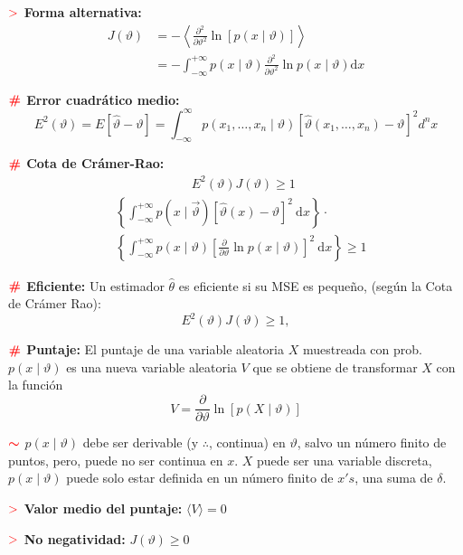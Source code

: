\documentclass[%
 reprint,
 amsmath,amssymb,
 aps,
]{revtex4-1}
\begin{document}
\textbf{$\textcolor{red}{\mathbf{>}}$ Forma alternativa:} 
$$
\begin{aligned}
J(\vartheta) &=-\left\langle\frac{\partial^{2}}{\partial \vartheta^{2}} \ln [p(x \mid \vartheta)]\right\rangle \\
&=-\int_{-\infty}^{+\infty} p(x \mid \vartheta) \frac{\partial^{2}}{\partial \vartheta^{2}} \ln p(x \mid \vartheta) \mathrm{d} x
\end{aligned}
$$

\textbf{$\color{red}{\textbf{\#}}$ Error cuadrático medio:}
$$
E^{2}(\vartheta) = E[ \hat{\vartheta} - \vartheta ] = \int_{-\infty}^\infty p\left(x_{1}, \ldots, x_{n} \mid \vartheta\right)\left[\hat{\vartheta}\left(x_{1}, \ldots, x_{n}\right)-\vartheta\right]^{2} {d}^{n} x 
$$

\textbf{$\color{red}{\textbf{\#}}$ Cota de Crámer-Rao:}
$$
\begin{aligned}
  &\qquad \qquad \qquad E^{2}(\vartheta) J(\vartheta) \geq 1 \\
  &\left\{\int_{-\infty}^{+\infty} p(x \mid \vec{\vartheta})[\hat{\vartheta}(x)-\vartheta]^{2} \mathrm{~d} x\right\}
  \cdot \\
  &\left\{\int_{-\infty}^{+\infty} p(x \mid \vartheta)\left[\frac{\partial}{\partial \vartheta} \ln p(x \mid \vartheta)\right]^{2} \mathrm{~d} x\right\} \geq 1  
\end{aligned}
$$

\textbf{$\color{red}{\textbf{\#}}$ Eficiente:} 
Un estimador $\hat{\theta}$ es eficiente si su MSE es pequeño, (según la Cota de Crámer Rao):
$$
E^{2}(\vartheta) J(\vartheta) \geq 1,
$$

\textbf{$\color{red}{\textbf{\#}}$ Puntaje:} 
El puntaje de una variable aleatoria $X$ muestreada con prob. $p(x \mid \vartheta)$ es una nueva variable
aleatoria $V$ que se obtiene de transformar $X$ con la función
$$
V=\frac{\partial}{\partial \vartheta} \ln [p(X \mid \vartheta)]
$$

\textbf{$\textcolor{red}{\color{red}{\boldsymbol{\sim}}}$}
$p(x \mid \vartheta)$ debe ser derivable (y $\boldsymbol{\therefore}$, continua) en $\vartheta$, salvo un número finito de puntos, pero, puede no ser continua en $x$. $X$ puede ser una variable discreta, $p(x \mid \vartheta)$ puede solo estar definida en un número finito de $x's$, una suma de $\delta$.

\textbf{$\textcolor{red}{\mathbf{>}}$ Valor medio del puntaje:} 
$\langle V \rangle = 0$

\textbf{$\textcolor{red}{\mathbf{>}}$ No negatividad:} 
$J(\vartheta) \geq 0$ 
\end{document}
